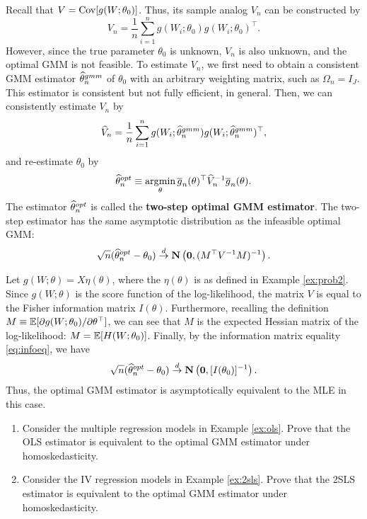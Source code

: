 \documentclass[11pt, A4paper, openany, uplatex]{book}
\begin{document}
Recall that $V = \mathrm{Cov}[g(W; \theta_0)]$.
Thus, its sample analog $V_n$ can be constructed by
\[
	V_n = \frac{1}{n} \sum_{i = 1}^n g(W_i; \theta_0)g(W_i; \theta_0)^\top.
\]
However, since the true parameter $\theta_0$ is unknown, $V_n$ is also unknown, and the optimal GMM is not feasible.
To estimate $V_n$, we first need to obtain a consistent GMM estimator $\widehat \theta_n^{gmm}$ of $\theta_0$ with an arbitrary weighting matrix, such as $\Omega_n = I_J$.
This estimator is consistent but not fully efficient, in general.
Then, we can consistently estimate $V_n$ by
\[
	\widehat V_n  = \frac{1}{n} \sum_{i = 1}^n g(W_i; \widehat \theta_n^{gmm})g(W_i; \widehat \theta_n^{gmm})^\top,
\]
and re-estimate $\theta_0$ by
\[
	\widehat \theta_n^{opt} \equiv \operatorname*{\arg\!\min}_{\theta} \overline{g}_n(\theta)^\top \widehat V_n^{-1} \overline{g}_n(\theta).
 \] 
 The estimator $\widehat \theta_n^{opt} $ is called the \textbf{two-step optimal GMM estimator}.
The two-step estimator has the same asymptotic distribution as the infeasible optimal GMM:
\[
	\sqrt{n} (\widehat \theta_n^{opt} - \theta_0)  \overset{d}{\to} \mathbf{N}\left(\mathbf{0},  (M^\top V^{-1} M )^{-1}  \right).
\]

\begin{example}\upshape
	Let $g(W; \theta) = X\eta(\theta)$, where the $\eta(\theta)$ is as defined in Example \ref{ex:prob2}.
	Since $g(W; \theta)$ is the score function of the log-likelihood, the matrix $V$ is equal to the Fisher information matrix $I(\theta)$.
	Furthermore, recalling the definition $M \equiv  \mathbb{E}[ \partial g(W; \theta_0) / \partial \theta^\top]$, we can see that $M$ is the expected Hessian matrix of the log-likelihood: $M = \mathbb{E}[H(W; \theta_0)]$.
	Finally, by the information matrix equality \eqref{eq:infoeq}, we have
	\[
	\sqrt{n} (\widehat \theta_n^{opt} - \theta_0)  \overset{d}{\to} \mathbf{N}\left(\mathbf{0}, [I(\theta_0)]^{-1}  \right).
	\]
	Thus, the optimal GMM estimator is asymptotically equivalent to the MLE in this case.
\end{example}

\hrulefill
\begin{exercise}\upshape
	\begin{enumerate}
	\item Consider the multiple regression models in Example \ref{ex:ols}. 
	Prove that the OLS estimator is equivalent to the optimal GMM estimator under homoskedasticity.
	\item Consider the IV regression models in Example \ref{ex:2sls}.
	Prove that the 2SLS estimator is equivalent to the optimal GMM estimator under homoskedasticity.
	\end{enumerate}
\end{exercise}
\end{document}

